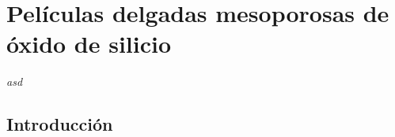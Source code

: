  \newcommand{\NoBiblioMeso}[1]{
 \ifthenelse{\equal{#1}{verdadero}}{}{}
 \NoBiblioMeso{verdadero}}

 
 \FormatoCapituloDosLineas
 
 \chapter{Películas delgadas mesoporosas de óxido de silicio}
 \label{chap:Mesoporosos}

 \thispagestyle{empty}
	
 \noindent\textit{asd}
  
 
 \vfill
 \minitoc
 \newpage

\section{Introducción}

